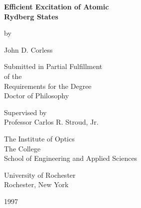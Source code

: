 



\begin{singlespace}
\begin{center}
{\huge

\vspace* {0.45in}

{\bf Efficient Excitation of Atomic\\
Rydberg States}

\vskip 0.4in

by

\vskip 0.4in

John D. Corless}

\vskip 1.0in

Submitted in Partial Fulfillment\\          
of the\\                                    
Requirements for the Degree\\               
Doctor of Philosophy                      
\vskip 0.2in

Supervised by\\                             
Professor Carlos R. Stroud, Jr.               
\vskip 1.0in
                                           
The Institute of Optics\\                   
The College\\
School of Engineering and Applied Sciences
\vskip 0.2in
                                                                                          
University of Rochester\\                   
Rochester, New York\\                       
\vskip 0.2in

1997                                      
                                                              
\end{center}
\end{singlespace}

\thispagestyle{empty}

\newpage




